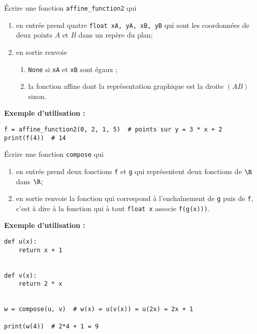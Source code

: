 \documentclass[a4paper,12pt,french]{article}
\begin{document}
\begin{exercice}
	\'Ecrire une fonction \texttt{affine_function2} qui 
\begin{enumerate}[--]
	\item 	en entrée prend quatre \texttt{float xA, yA, xB, yB} qui sont les coordonnées de deux points $A$ et $B$ dans un repère du plan;
	\item 	en sortie renvoie 
	\begin{enumerate}[--]
		\item 	\texttt{None} si \texttt{xA} et \texttt{xB} sont égaux ;
		\item 	la fonction affine dont la représentation graphique est la droite $(AB)$ sinon.
	\end{enumerate}
\end{enumerate}
\textbf{Exemple d'utilisation :}
\begin{verbatim}
f = affine_function2(0, 2, 1, 5)  # points sur y = 3 * x + 2
print(f(4))  # 14
\end{verbatim}
\end{exercice}

\begin{exercice}
	\'Ecrire une fonction \texttt{compose} qui 
\begin{enumerate}[--]
	\item 	en entrée prend deux fonctions \texttt{f} et \texttt{g} qui représentent deux fonctions de $\R$ dans $\R$;
	\item 	en sortie renvoie la fonction qui correspond à l'enchaînement de \texttt{g} puis de \texttt{f}, c'est à dire à la fonction qui à tout \texttt{float x}  associe \texttt{f(g(x)))}.
\end{enumerate}
\textbf{Exemple d'utilisation :}
\begin{verbatim}
def u(x):
    return x + 1


def v(x):
    return 2 * x


w = compose(u, v)  # w(x) = u(v(x)) = u(2x) = 2x + 1

print(w(4))  # 2*4 + 1 = 9
\end{verbatim}

\end{exercice}
\end{document}
